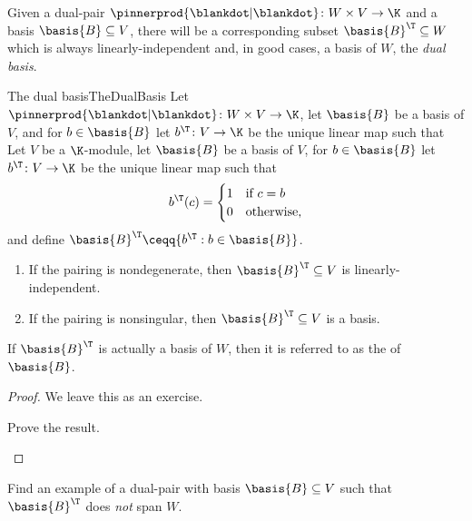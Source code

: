 Given a dual-pair $\pinnerprod{\blankdot |\blankdot}\colon W\times V\rightarrow \K$ and a basis $\basis{B}\subseteq V$, there will be a corresponding subset $\basis{B}^{\T}\subseteq W$ which is always linearly-independent and, in good cases, a basis of $W$, the \emph{dual basis}.
\begin{prp}{The dual basis}{TheDualBasis}
	Let $\pinnerprod{\blankdot |\blankdot}\colon W\times V\rightarrow \K$, let $\basis{B}$ be a basis of $V$, and for $b\in \basis{B}$ let $b^{\T}\colon V\rightarrow \K$ be the unique linear map such that
	Let $V$ be a $\K$-module, let $\basis{B}$ be a basis of $V$, for $b\in \basis{B}$ let $b^{\T}\colon V\rightarrow \K$ be the unique linear map such that
	\begin{equation}
	b^{\T}(c)=\begin{cases}1 & \text{if }c=b \\ 0 & \text{otherwise,}\end{cases}
	\end{equation}
	and define $\basis{B}^{\T}\ceqq \{ b^{\T}:b\in \basis{B}\}$.
	\begin{enumerate}
		\item If the pairing is nondegenerate, then $\basis{B}^{\T}\subseteq V$ is linearly-independent.
		\item If the pairing is nonsingular, then $\basis{B}^{\T}\subseteq V$ is a basis.
	\end{enumerate}
	\begin{rmk}
		If $\basis{B}^{\T}$ is actually a basis of $W$, then it is referred to as the  of $\basis{B}$.
	\end{rmk}
	\begin{proof}
		We leave this as an exercise.
		\begin{exr}[breakable=false]{}{}
			Prove the result.
		\end{exr}
	\end{proof}
\end{prp}
\begin{exr}{}{}
	Find an example of a dual-pair with basis $\basis{B}\subseteq V$ such that $\basis{B}^{\T}$ does \emph{not} span $W$.
\end{exr}

